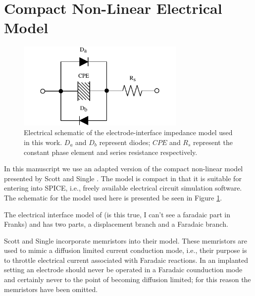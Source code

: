 \documentclass[journal, a4paper]{IEEEtran}
\begin{document}
{
    \color{blue}
\section{Compact Non-Linear Electrical Model}
\label{sect:resistorNetwork}
\begin{figure}
    \begin{center}
        \includegraphics[width=230pt]{graphics/interfaceSchematic_noMemristive}
    \end{center}
    \caption{Electrical schematic of the electrode-interface impedance model used in this work. $D_{a}$ and $D_{b}$ represent diodes; $CPE$ and $R_{s}$ represent the constant phase element and series resistance respectively.}
    \label{fig:schematic}
\end{figure}

In this manuscript we use an adapted version of the compact non-linear model presented by Scott and Single \cite{ScottSingle2013}. The model is compact in that it is suitable for entering into SPICE, i.e., freely available electrical circuit simulation software. The schematic for the model used here is presented be seen in Figure \ref{fig:schematic}.
}
The electrical interface model of \cite{Franks2005} {\color{red} (is this true, I can't see a faradaic part in Franks)} and \cite{ScottSingle2013} has two parts, a displacement branch and a Faradaic branch.

Scott and Single \cite{ScottSingle2013} incorporate memristors into their model. {
    \color{blue}
    These memristors are used to mimic a diffusion limited current conduction mode, i.e., their purpose is to throttle electrical current associated with Faradaic reactions. In an implanted setting an electrode should never be operated in a Faradaic counduction mode and certainly never to the point of becoming diffusion limited; for this reason the memristors have been omitted.
}


\end{document}
